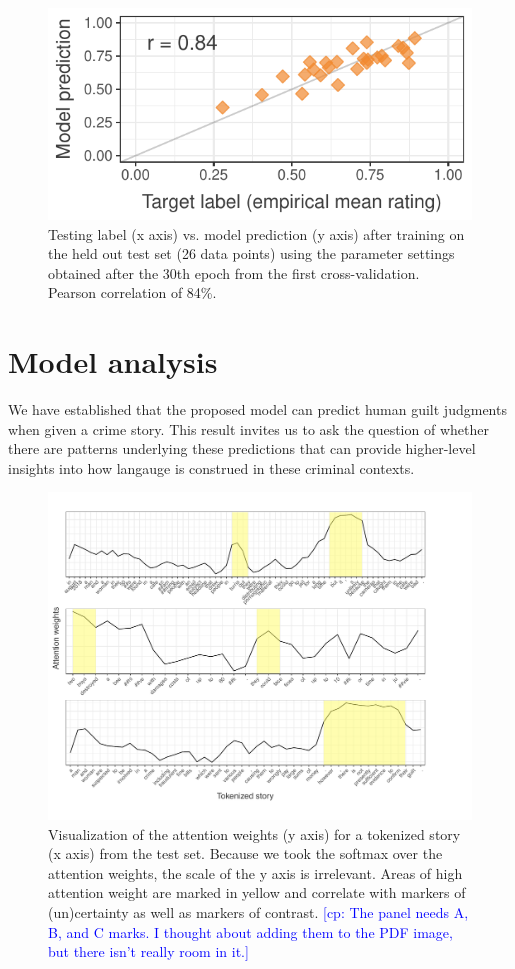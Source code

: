 \documentclass[11pt,a4paper]{article}
\newcommand{\cp}[1]{\textcolor{Blue}{[cp: #1]}}
\begin{document}
\begin{figure}
  \includegraphics[width=\linewidth]{graphs/test-corr.pdf}
  \caption{Testing label (x axis) vs. model prediction (y axis) after training on the held out test set (26 data points) using the parameter settings obtained after the 30th epoch from the first cross-validation. Pearson correlation of 84\%.}
  \label{fig:test-corr}
\end{figure}


\section{Model analysis}

We have established that the proposed model can predict human guilt judgments when given a crime story. This result invites us to ask the question of whether there are patterns underlying these predictions that can provide higher-level insights into how langauge is construed in these criminal contexts. 

\begin{figure}[t]
  \centering
  \includegraphics[width=1\linewidth]{graphs/attention-marked.pdf}
  \caption{Visualization of the attention weights (y axis) for a tokenized story (x axis) from the test set. Because we took the softmax over the attention weights, the scale of the y axis is irrelevant. Areas of high attention weight are marked in yellow and correlate with markers of (un)certainty as well as markers of contrast. \cp{The panel needs A, B, and C marks. I thought about adding them to the PDF image, but there isn't really room in it.}}
  \label{fig:viz}
\end{figure}
\end{document}
